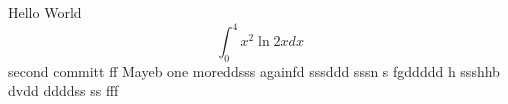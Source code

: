 \documentclass{article}
\begin{document}
Hello World
$$\int_0^4 x^2 \ln{2x}dx$$
second committ  ff
Mayeb
one moreddsss
againfd
sssddd sssn
s fgddddd h 
ssshhb dvdd ddddss ss fff
\end{document}
